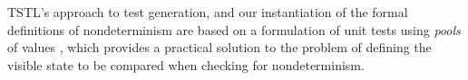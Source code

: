 TSTL's approach to test generation, and our instantiation of the formal definitions of nondeterminism are based on a formulation of unit tests using \emph{pools} of values \cite{AndrewsTR}, which provides a practical solution to the problem of defining the visible state to be compared when checking for nondeterminism.

\begin{comment}
Finally, Cotroneo et al. \cite{CompBugs,FaultTriggers}, and Grottke and Trivedi \cite{GrottkeBugs} have followed on early work on understanding bugs and how they manifest, including transient \cite{Transient} software faults.  This work informs our attempt to identify sources of nondeterminism, and should provide other, context and project-specific, sources that could be introduced into our general framework.
\end{comment}